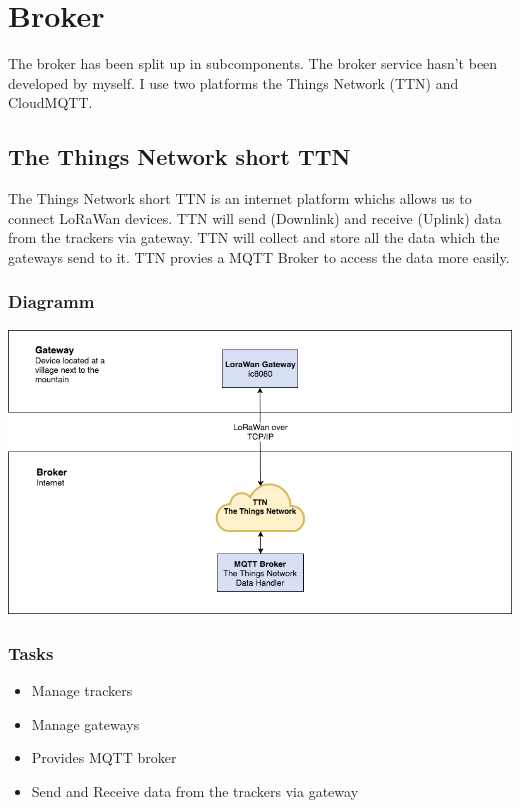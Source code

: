 \documentclass[a4paper,11pt, oneside]{report}
\theoremstyle{definition}
\begin{document}
\newpage

\section{Broker}
The broker has been split up in subcomponents. The broker service hasn't been developed by myself. I use two platforms the Things Network (TTN) and CloudMQTT.

\subsection{The Things Network short TTN}
The Things Network short TTN is an internet platform whichs allows us to connect LoRaWan devices. TTN will send (Downlink) and receive (Uplink) data from the trackers via gateway. TTN will collect and store all the data which the gateways send to it. TTN provies a MQTT Broker to access the data more easily.

\subsubsection{Diagramm}
\includegraphics[width=\textwidth]{img/ATAS_SystemOverview_Detail_TTN.png}

\subsubsection{Tasks}
\begin{itemize}
\item Manage trackers
\item Manage gateways
\item Provides MQTT broker
\item Send and Receive data from the trackers via gateway
\end{itemize}
\end{document}
